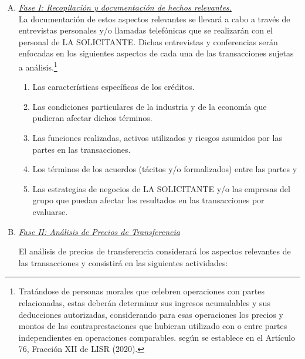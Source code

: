 \documentclass[5pt,letter]{report}
\begin{document}
\begin{enumerate}[A)]


\item \textit{\underline{Fase I: Recopilación y documentación de hechos relevantes.}}\\ 

La documentación de estos aspectos relevantes se llevará a cabo a través de entrevistas personales y/o llamadas telefónicas que se realizarán con el personal de LA SOLICITANTE. Dichas entrevistas y conferencias serán enfocadas en los siguientes aspectos de cada una de las transacciones sujetas a análisis.\footnote{Tratándose de personas morales que celebren operaciones con partes relacionadas, estas deberán determinar sus ingresos acumulables y sus deducciones autorizadas, considerando para esas operaciones los precios y montos de las contraprestaciones que hubieran utilizado con o entre partes independientes en operaciones comparables. según se establece en el Artículo 76, Fracción XII de LISR (2020). } 

\begin{enumerate}[1.]

\item Las características específicas de los créditos.

\item Las condiciones particulares de la industria y de la economía que pudieran afectar dichos términos. 

\item Las funciones realizadas, activos utilizados y riesgos asumidos por las partes en las transacciones. 

\item Los términos de los acuerdos (tácitos y/o formalizados) entre las partes y 

\item Las estrategias de negocios de LA SOLICITANTE y/o las empresas del grupo que puedan afectar los resultados en las transacciones por evaluarse. 

\end{enumerate}

\item \textit{\underline{Fase II:  Análisis de Precios de Transferencia}} 

El análisis de precios de transferencia considerará los aspectos relevantes de las transacciones y consistirá en las siguientes actividades: 

\begin{enumerate}[1.]


\end{enumerate}
\end{enumerate}
\end{document}
